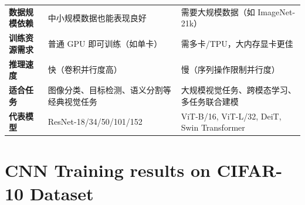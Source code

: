 \documentclass[UTF8]{report}
\theoremstyle{MyLineTheoremStyle} %
\theoremstyle{MyBlockTheoremStyle} %
\theoremstyle{MySubsubsectionStyle} %
\begin{document}
\begin{longtable}{@{}p{}p{}p{}@{}}
\textbf{数据规模依赖}       & 中小规模数据也能表现良好                       & 需要大规模数据（如 ImageNet-21k）           \\
\textbf{训练资源需求}       & 普通 GPU 即可训练（如单卡）                    & 需多卡/TPU，大内存显卡更佳                  \\
\textbf{推理速度}           & 快（卷积并行度高）                             & 慢（序列操作限制并行度）                     \\
\textbf{适合任务}           & 图像分类、目标检测、语义分割等经典视觉任务     & 大规模视觉任务、跨模态学习、多任务联合建模   \\
\textbf{代表模型}           & ResNet-18/34/50/101/152                        & ViT-B/16, ViT-L/32, DeiT, Swin Transformer    \\
\bottomrule
\end{longtable}



\cleardoublepage


\section{CNN Training results on CIFAR-10 Dataset}  
\end{document}
